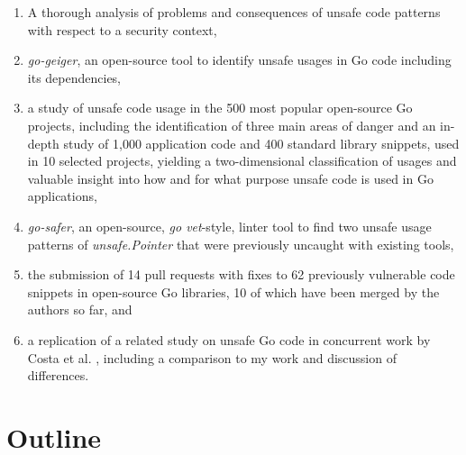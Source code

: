 \begin{enumerate}
    \item A thorough analysis of problems and consequences of unsafe code patterns with respect to a security context,

    \item \textit{go-geiger}, an open-source tool to identify unsafe usages in Go code including its dependencies,

    \item a study of unsafe code usage in the 500 most popular open-source Go projects, including the identification
    of three main areas of danger and an in-depth study of 1,000 application code and 400 standard library snippets,
    used in 10 selected projects, yielding a two-dimensional classification of usages and valuable insight into how and
    for what purpose unsafe code is used in Go applications,

    \item \textit{go-safer}, an open-source, \textit{go vet}-style, linter tool to find two unsafe usage patterns of
    \textit{unsafe.Pointer} that were previously uncaught with existing tools,

    \item the submission of 14 pull requests with fixes to 62 previously vulnerable code snippets in open-source Go
    libraries, 10 of which have been merged by the authors so far, and

    \item a replication of a related study on unsafe Go code in concurrent work by Costa et al. \cite{costa2020},
    including a comparison to my work and discussion of differences.
\end{enumerate}



\section{Outline}\label{sec:outline}

